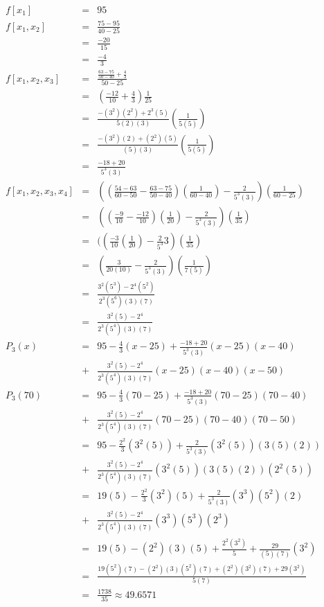 \documentclass[12pt]{article}
\begin{document}
\begin{eqnarray*}
  f[x_1] & = & 95\\
  f[x_1, x_2]  & = & \frac{75 - 95}{40-25}\\
  & = & \frac{-20}{15}\\
  & = & \frac{-4}{3}\\
  f[x_1, x_2, x_3] & = & \frac{\frac{63-75}{50-40} + \frac{4}{3}}{50-25}\\
  & = & (\frac{-12}{10} + \frac{4}{3})\frac{1}{25}\\
  & = & \frac{-(3^2)(2^2) + 2^3(5)}{5(2)(3)}(\frac{1}{5(5)})\\
  & = & \frac{-(3^2)(2) + (2^2)(5)}{(5)(3)}(\frac{1}{5(5)})\\
  & = & \frac{-18 + 20}{5^3(3)}\\
  f[x_1, x_2, x_3, x_4] & = & ((\frac{54-63}{60-50} - \frac{63-75}{50-40})(\frac{1}{60-40}) - \frac{2}{5^3(3)})(\frac{1}{60-25})\\
  & = & ((\frac{-9}{10} - \frac{-12}{10})(\frac{1}{20}) - \frac{2}{5^3(3)})(\frac{1}{35})\\
  & = & ((\frac{-3}{10}(\frac{1}{20}) - \frac{2}{5^3}{3})(\frac{1}{35})\\
  & = & (\frac{3}{20(10)} - \frac{2}{5^3(3)})(\frac{1}{7(5)})\\
  & = & \frac{3^2(5^3) - 2^4(5^2)}{2^3(5^6)(3)(7)}\\
  & = & \frac{3^2(5) - 2^4}{2^3(5^4)(3)(7)}\\
  P_3(x) & = & 95 - \frac{4}{3}(x-25) + \frac{-18 + 20}{5^3(3)}(x-25)(x-40)\\
  & + &\frac{3^2(5) - 2^4}{2^3(5^4)(3)(7)}(x-25)(x-40)(x-50)\\
  P_3(70) & = & 95 - \frac{4}{3}(70-25) + \frac{-18 + 20}{5^3(3)}(70-25)(70-40)\\
  & + &\frac{3^2(5) - 2^4}{2^3(5^4)(3)(7)}(70-25)(70-40)(70-50)\\
  & = & 95 - \frac{2^2}{3}(3^2(5)) + \frac{2}{5^3(3)}(3^2(5))(3(5)(2))\\
  & + &\frac{3^2(5) - 2^4}{2^3(5^4)(3)(7)}(3^2(5))(3(5)(2))(2^2(5))\\
  & = & 19(5) - \frac{2^2}{3}(3^2)(5) + \frac{2}{5^3(3)}(3^3)(5^2)(2)\\
  & + &\frac{3^2(5) - 2^4}{2^3(5^4)(3)(7)}(3^3)(5^3)(2^3)\\
  & = & 19(5) - (2^2)(3)(5) + \frac{2^2(3^2)}{5} + \frac{29}{(5)(7)}(3^2)\\
  & = & \frac{19(5^2)(7) - (2^2)(3)(5^2)(7) + (2^2)(3^2)(7) + 29(3^2)}{5(7)}\\
  & = & \frac{1738}{35} \approx 49.6571\\
\end{eqnarray*}
\end{document}
